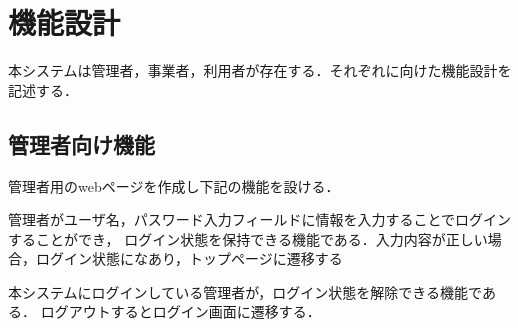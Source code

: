 \documentclass[a4paper, titlepage]{jsarticle}
\begin{document}
\section{機能設計}
本システムは管理者，事業者，利用者が存在する．それぞれに向けた機能設計を記述する．
\subsection{管理者向け機能}
管理者用のwebページを作成し下記の機能を設ける．
\begin{description}[labelwidth=\linewidth]
  \setlength{\leftskip}{1em}
  \item [ログイン機能] 管理者がユーザ名，パスワード入力フィールドに情報を入力することでログインすることができ，
  ログイン状態を保持できる機能である．入力内容が正しい場合，ログイン状態になあり，トップページに遷移する
  \item [ログアウト機能] 本システムにログインしている管理者が，ログイン状態を解除できる機能である．
  ログアウトするとログイン画面に遷移する．


\end{description}
\end{document}
